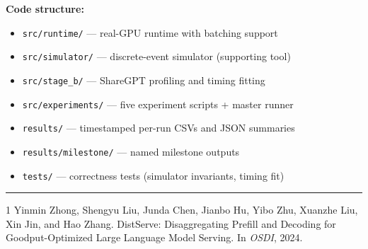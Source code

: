 \documentclass[11pt,letterpaper]{article}
\begin{document}
\textbf{Code structure:}
\begin{itemize}[noitemsep,topsep=2pt]
  \item \texttt{src/runtime/} --- real-GPU runtime with batching support
  \item \texttt{src/simulator/} --- discrete-event simulator (supporting tool)
  \item \texttt{src/stage\_b/} --- ShareGPT profiling and timing fitting
  \item \texttt{src/experiments/} --- five experiment scripts + master runner
  \item \texttt{results/} --- timestamped per-run CSVs and JSON summaries
  \item \texttt{results/milestone/} --- named milestone outputs
  \item \texttt{tests/} --- correctness tests (simulator invariants, timing fit)
\end{itemize}

\vspace{6pt}
\noindent\rule{\linewidth}{0.4pt}
\begin{thebibliography}{1}
Yinmin Zhong, Shengyu Liu, Junda Chen, Jianbo Hu, Yibo Zhu, Xuanzhe Liu,
Xin Jin, and Hao Zhang.
\newblock DistServe: Disaggregating Prefill and Decoding for Goodput-Optimized
Large Language Model Serving.
\newblock In \textit{OSDI}, 2024.
\end{thebibliography}
\end{document}
